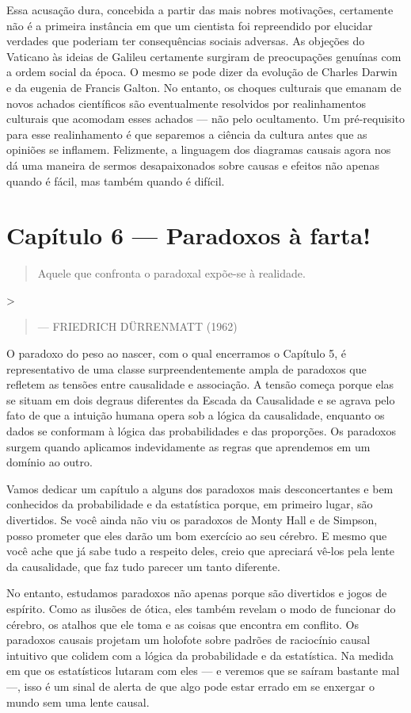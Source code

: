 \documentclass[11pt,a5paper,twoside]{book}
\begin{document}
Essa acusação dura, concebida a partir das mais nobres motivações, certamente não é a primeira instância em que um cientista foi repreendido por elucidar verdades que poderiam ter consequências sociais adversas. As objeções do Vaticano às ideias de Galileu certamente surgiram de preocupações genuínas com a ordem social da época. O mesmo se pode dizer da evolução de Charles Darwin e da eugenia de Francis Galton. No entanto, os choques culturais que emanam de novos achados científicos são eventualmente resolvidos por realinhamentos culturais que acomodam esses achados — não pelo ocultamento. Um pré-requisito para esse realinhamento é que separemos a ciência da cultura antes que as opiniões se inflamem. Felizmente, a linguagem dos diagramas causais agora nos dá uma maneira de sermos desapaixonados sobre causas e efeitos não apenas quando é fácil, mas também quando é difícil.

\chapter{Capítulo 6 — Paradoxos à farta!}
\begin{quote}
Aquele que confronta o paradoxal expõe-se à realidade.
\end{quote}
>

\begin{quote}
— FRIEDRICH DÜRRENMATT (1962)
\end{quote}
O paradoxo do peso ao nascer, com o qual encerramos o Capítulo 5, é representativo de uma classe surpreendentemente ampla de paradoxos que refletem as tensões entre causalidade e associação. A tensão começa porque elas se situam em dois degraus diferentes da Escada da Causalidade e se agrava pelo fato de que a intuição humana opera sob a lógica da causalidade, enquanto os dados se conformam à lógica das probabilidades e das proporções. Os paradoxos surgem quando aplicamos indevidamente as regras que aprendemos em um domínio ao outro.

Vamos dedicar um capítulo a alguns dos paradoxos mais desconcertantes e bem conhecidos da probabilidade e da estatística porque, em primeiro lugar, são divertidos. Se você ainda não viu os paradoxos de Monty Hall e de Simpson, posso prometer que eles darão um bom exercício ao seu cérebro. E mesmo que você ache que já sabe tudo a respeito deles, creio que apreciará vê-los pela lente da causalidade, que faz tudo parecer um tanto diferente.

No entanto, estudamos paradoxos não apenas porque são divertidos e jogos de espírito. Como as ilusões de ótica, eles também revelam o modo de funcionar do cérebro, os atalhos que ele toma e as coisas que encontra em conflito. Os paradoxos causais projetam um holofote sobre padrões de raciocínio causal intuitivo que colidem com a lógica da probabilidade e da estatística. Na medida em que os estatísticos lutaram com eles — e veremos que se saíram bastante mal —, isso é um sinal de alerta de que algo pode estar errado em se enxergar o mundo sem uma lente causal.
\end{document}
